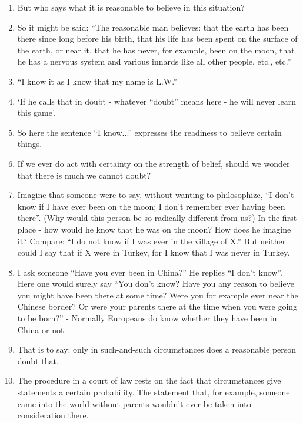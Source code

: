 \documentclass{book}
\begin{document}
\begin{enumerate}
\item
But who says what it is reasonable to believe in this situation?

\item
So it might be said: ``The reasonable man believes: that the earth has been
there since long before his birth, that his life has been spent on the surface
of the earth, or near it, that he has never, for example, been on the moon,
that he has a nervous system and various innards like all other people, etc.,
etc.''

\item
``I know it as I know that my name is L.W.''

\item
`If he calls that in doubt - whatever ``doubt'' means here - he will never
learn this game'.

\item
So here the sentence ``I know...'' expresses the readiness to believe certain
things.

\item
If we ever do act with certainty on the strength of belief, should we wonder
that there is much we cannot doubt?

\item
Imagine that someone were to say, without wanting to philosophize, ``I don't
know if I have ever been on the moon; I don't remember ever having been
there''. (Why would this person be so radically different from us?) In the
first place - how would he know that he was on the moon? How does he imagine
it? Compare: ``I do not know if I was ever in the village of X.'' But neither
could I say that if X were in Turkey, for I know that I was never in Turkey.

\item
I ask someone ``Have you ever been in China?'' He replies ``I don't know''.
Here one would surely say ``You don't know? Have you any reason to believe you
might have been there at some time? Were you for example ever near the Chinese
border? Or were your parents there at the time when you were going to be
born?'' - Normally Europeans do know whether they have been in China or not.

\item
That is to say: only in such-and-such circumstances does a reasonable person
doubt that.

\item
The procedure in a court of law rests on the fact that circumstances give
statements a certain probability. The statement that, for example, someone came
into the world without parents wouldn't ever be taken into consideration there.


\end{enumerate}
\end{document}
